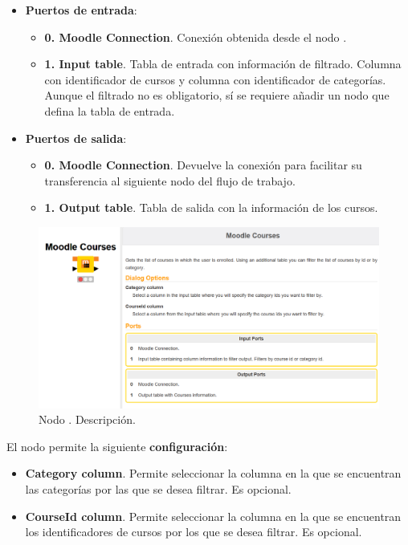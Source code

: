 \begin{itemize}
	\item \textbf{Puertos de entrada}: 
    \begin{itemize}
		\item \textbf{0. Moodle Connection}. Conexión obtenida desde el nodo . 
		\item \textbf{1. Input table}. Tabla de entrada con información de filtrado. 
		Columna con identificador de cursos y columna con identificador de categorías. Aunque el filtrado no es obligatorio, sí se 
		requiere añadir un nodo que defina la tabla de entrada. 
   	\end{itemize}

	\item \textbf{Puertos de salida}: 
    \begin{itemize}
		\item \textbf{0. Moodle Connection}. Devuelve la conexión para facilitar su transferencia al siguiente nodo del flujo de trabajo. 
		\item \textbf{1. Output table}. Tabla de salida con la información de los cursos. 
   	\end{itemize}

\end{itemize}

\begin{figure}[!h]
	\centering
	\includegraphics[width=1\textwidth]{img/nodes_moodle_courses.png}
	\caption{Nodo . Descripción.}
	\label{fig:moodlecourses}
\end{figure}
\FloatBarrier



El nodo permite la siguiente \textbf{configuración}: 

\begin{itemize}
   \item \textbf{Category column}. Permite seleccionar la columna en la que se encuentran las categorías por las que se desea filtrar. Es opcional. 
   \item \textbf{CourseId column}. Permite seleccionar la columna en la que se encuentran los identificadores de cursos por los que se desea filtrar. Es opcional. 
\end{itemize}


